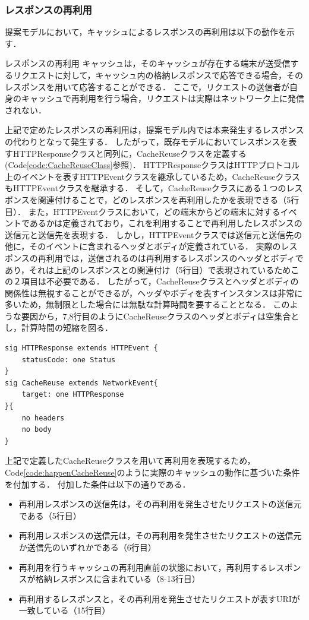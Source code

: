 \documentclass[12pt,a4paper]{jbook}
\begin{document}
\subsubsection{レスポンスの再利用}
提案モデルにおいて，キャッシュによるレスポンスの再利用は以下の動作を示す．

\begin{itembox}[l]{レスポンスの再利用}
キャッシュは，そのキャッシュが存在する端末が送受信するリクエストに対して，キャッシュ内の格納レスポンスで応答できる場合，そのレスポンスを用いて応答することができる．
ここで，リクエストの送信者が自身のキャッシュで再利用を行う場合，リクエストは実際はネットワーク上に発信されない．
\end{itembox}

上記で定めたレスポンスの再利用は，提案モデル内では本来発生するレスポンスの代わりとなって発生する．
したがって，既存モデルにおいてレスポンスを表すHTTPResponseクラスと同列に，CacheReuseクラスを定義する(Code\ref{code:CacheReuseClass}参照)．
HTTPResponseクラスはHTTPプロトコル上のイベントを表すHTTPEventクラスを継承しているため，CacheReuseクラスもHTTPEventクラスを継承する．
そして，CacheReuseクラスにある１つのレスポンスを関連付けることで，どのレスポンスを再利用したかを表現できる（5行目）．
また，HTTPEventクラスにおいて，どの端末からどの端末に対するイベントであるかは定義されており，これを利用することで再利用したレスポンスの送信元と送信先を表現する．
しかし，HTTPEventクラスでは送信元と送信先の他に，そのイベントに含まれるヘッダとボディが定義されている．
実際のレスポンスの再利用では，送信されるのは再利用するレスポンスのヘッダとボディであり，それは上記のレスポンスとの関連付け（5行目）で表現されているためこの２項目は不必要である．
したがって，CacheReuseクラスとヘッダとボディの関係性は無視することができるが，ヘッダやボディを表すインスタンスは非常に多いため，無制限とした場合には無駄な計算時間を要することとなる．
このような要因から，7,8行目のようにCacheReuseクラスのヘッダとボディは空集合とし，計算時間の短縮を図る．

\begin{lstlisting}[caption=CacheReuseクラス, label=code:CacheReuseClass]
sig HTTPResponse extends HTTPEvent {
	statusCode: one Status
}
sig CacheReuse extends NetworkEvent{
	target: one HTTPResponse
}{
	no headers
	no body
}
\end{lstlisting}

上記で定義したCacheReuseクラスを用いて再利用を表現するため，Code\ref{code:happenCacheReuse}のように実際のキャッシュの動作に基づいた条件を付加する．
付加した条件は以下の通りである．
\begin{itemize}
\item 再利用レスポンスの送信先は，その再利用を発生させたリクエストの送信元である（5行目）
\item 再利用レスポンスの送信元は，その再利用を発生させたリクエストの送信元か送信先のいずれかである（6行目）
\item 再利用を行うキャッシュの再利用直前の状態において，再利用するレスポンスが格納レスポンスに含まれている（8-13行目）
\item 再利用するレスポンスと，その再利用を発生させたリクエストが表すURIが一致している（15行目）
\end{itemize}
\end{document}
